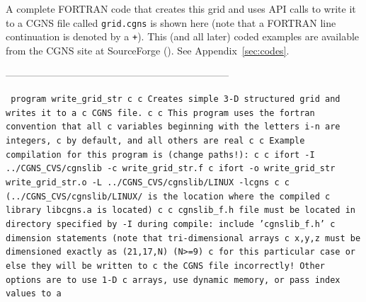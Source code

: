 \documentclass[12pt]{article}
\begin{document}
A complete FORTRAN code that creates this grid and
uses API calls to write it
to a CGNS file called {\tt grid.cgns} is shown here 
(note that a FORTRAN line continuation
is denoted by a {\tt +}).  This (and all later) coded examples
are available from the CGNS site at SourceForge
().
See Appendix~\ref{sec:codes}.

--------------------------------------------------------------------

{\tt 
\indent       program write\_grid\_str
\newline c
\newline c   Creates simple 3-D structured grid and writes it to a
\newline c   CGNS file.
\newline c
\newline c   This program uses the fortran convention that all
\newline c   variables beginning with the letters i-n are integers,
\newline c   by default, and all others are real
\newline c
\newline c   Example compilation for this program is (change paths!):
\newline c
\newline c   ifort -I ../CGNS\_CVS/cgnslib -c write\_grid\_str.f
\newline c   ifort -o write\_grid\_str write\_grid\_str.o -L ../CGNS\_CVS/cgnslib/LINUX -lcgns
\newline c
\newline c   (../CGNS\_CVS/cgnslib/LINUX/ is the location where the compiled
\newline c   library libcgns.a is located)
\newline c
\newline c   cgnslib\_f.h file must be located in directory specified by -I during compile:
\newline\indent      include 'cgnslib\_f.h'
\newline c   dimension statements (note that tri-dimensional arrays
\newline c   x,y,z must be dimensioned exactly as (21,17,N) (N>=9)
\newline c   for this particular case or else they will be written to
\newline c   the CGNS file incorrectly!  Other options are to use 1-D
\newline c   arrays, use dynamic memory, or pass index values to a
}
\end{document}
